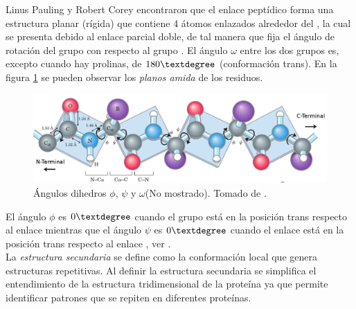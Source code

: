 Linus Pauling y Robert Corey encontraron que el enlace pept\'{i}dico forma una estructura planar (r\'{i}gida) que contiene 4 \'{a}tomos enlazados alrededor del , la cual se presenta debido al enlace parcial doble, de tal manera que fija el \'{a}ngulo de rotaci\'{o}n del grupo  con respecto al grupo . El \'{a}ngulo $\omega$ entre los dos grupos es, excepto cuando hay prolinas, de $180\textdegree$ (conformaci\'{o}n trans). En la figura \ref{fig:pepti2} se pueden observar los \textit{planos amida} de los residuos.\\ 
\begin{figure}[H]
\centering
\includegraphics[scale=0.3]{Kap3/peptide.png}
\caption{\'{A}ngulos dihedros $\phi$, $\psi$ y $\omega$(No mostrado). Tomado de \cite{Nelson2011}.}\label{fig:pepti2}
\end{figure}
El \'{a}ngulo $\phi$ es $0\textdegree$ cuando el grupo  est\'{a} en la posici\'{o}n trans respecto al enlace  mientras que el \'{a}ngulo $\psi$ es  $0\textdegree$ cuando el enlace  est\'{a} en la posici\'{o}n trans respecto al enlace , ver \cite{Kuchel}.\\

La \textit{estructura secundaria} se define como la conformaci\'{o}n local que genera estructuras repetitivas. Al definir la estructura secundaria se simplifica el entendimiento de la estructura tridimensional de la prote\'{i}na ya que permite identificar patrones que se repiten en diferentes prote\'{i}nas.\\

